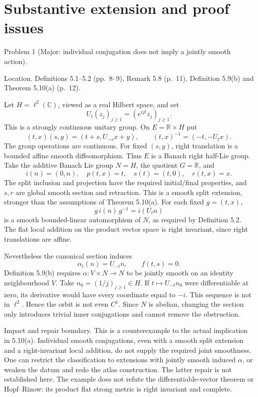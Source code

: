 \documentclass[10pt]{article}
\begin{document}
\section*{Substantive extension and proof issues}
Problem 1 (Major: individual conjugation does not imply a jointly smooth action).\par
Location. Definitions 5.1–5.2 (pp. 8–9), Remark 5.8 (p. 11), Definition 5.9(b) and Theorem 5.10(a) (p. 12).\par
Let \(H=\ell^2(\mathbb C)\), viewed as a real Hilbert space, and set \[U_t(z_j)_{j\ge1}=(e^{ijt}z_j)_{j\ge1}.\] This is a strongly continuous unitary group. On \(E=\mathbb R\times H\) put \[(t,x)(s,y)=(t+s,U_{-s}x+y),\qquad
 (t,x)^{-1}=(-t,-U_tx).\] The group operations are continuous. For fixed \((s,y)\), right translation is a bounded affine smooth diffeomorphism. Thus \(E\) is a Banach right half-Lie group. Take the additive Banach Lie group \(N=H\), the quotient \(G=\mathbb R\), and \[i(n)=(0,n),\quad p(t,x)=t,\quad s(t)=(t,0),\quad r(t,x)=x.\] The split inclusion and projection have the required initial/final properties, and \(s,r\) are global smooth section and retraction. This is a smooth split extension, stronger than the assumptions of Theorem 5.10(a). For each fixed \(g=(t,x)\), \[g\,i(n)\,g^{-1}=i(U_tn)\] is a smooth bounded-linear automorphism of \(N\), as required by Definition 5.2. The flat local addition on the product vector space is right invariant, since right translations are affine.\par
Nevertheless the canonical section induces \[\alpha_t(n)=U_{-t}n,\qquad f(t,s)=0.\] Definition 5.9(b) requires \(\alpha:V\times N\to N\) to be jointly smooth on an identity neighbourhood \(V\). Take \(n_0=(1/j)_{j\ge1}\in H\). If \(t\mapsto U_{-t}n_0\) were differentiable at zero, its derivative would have every coordinate equal to \(-i\). This sequence is not in \(\ell^2\). Hence the orbit is not even \(C^1\). Since \(N\) is abelian, changing the section only introduces trivial inner conjugations and cannot remove the obstruction.\par
Impact and repair boundary. This is a counterexample to the actual implication in 5.10(a). Individual smooth conjugations, even with a smooth split extension and a right-invariant local addition, do not supply the required joint smoothness. One can restrict the classification to extensions with jointly smooth induced \(\alpha\), or weaken the datum and redo the atlas construction. The latter repair is not established here. The example does not refute the differentiable-vector theorem or Hopf–Rinow: its product flat strong metric is right invariant and complete.\par
\end{document}
